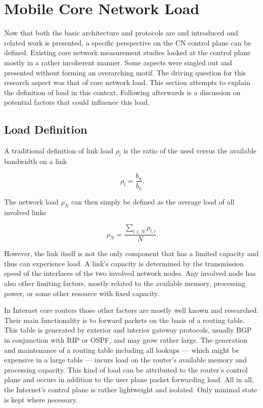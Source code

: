 \section{Mobile Core Network Load}
\label{c4:sec:loaddefinition}

Now that both the basic architecture and protocols are and introduced and related work is presented, a specific perspective on the \gls{CN} control plane can be defined. Existing core network measurement studies looked at the control plane mostly in a rather incoherent manner. Some aspects were singled out and presented without forming an overarching motif. The driving question for this research aspect was that of core network load. This section attempts to explain the definition of load in this context. Following afterwards is a discussion on potential factors that could influence this load.


\subsection{Load Definition}

A traditional definition of link load $\rho_{l}$ is the ratio of the used versus the available bandwidth on a link

\begin{equation}
	\phantom{.}\rho_{l} = \frac{b_{u}}{b_{a}}\text{.}
\end{equation}

The network load $\rho_{N}$ can then simply be defined as the average load of all involved links

\begin{equation}
	\phantom{.}\rho_{N} = \frac{\sum_{i \in N} \rho_{l,i}}{N}\text{.}
\end{equation}

However, the link itself is not the only component that has a limited capacity and thus can experience load. A link's capacity is determined by the transmission speed of the interfaces of the two involved network nodes. Any involved node has also other limiting factors, mostly related to the available memory, processing power, or some other resource with fixed capacity.

In Internet core routers those other factors are mostly well known and researched. Their main functionality is to forward packets on the basis of a routing table. This table is generated by exterior and interior gateway protocols, usually \gls{BGP} in conjunction with \gls{RIP} or \gls{OSPF}, and may grow rather large. The generation and maintenance of a routing table including all lookups --- which might be expensive in a large table --- incurs load on the router's available memory and processing capacity. This kind of load can be attributed to the router's control plane and occurs in addition to the user plane packet forwarding load. All in all, the Internet's control plane is rather lightweight and isolated. Only minimal state is kept where necessary.

